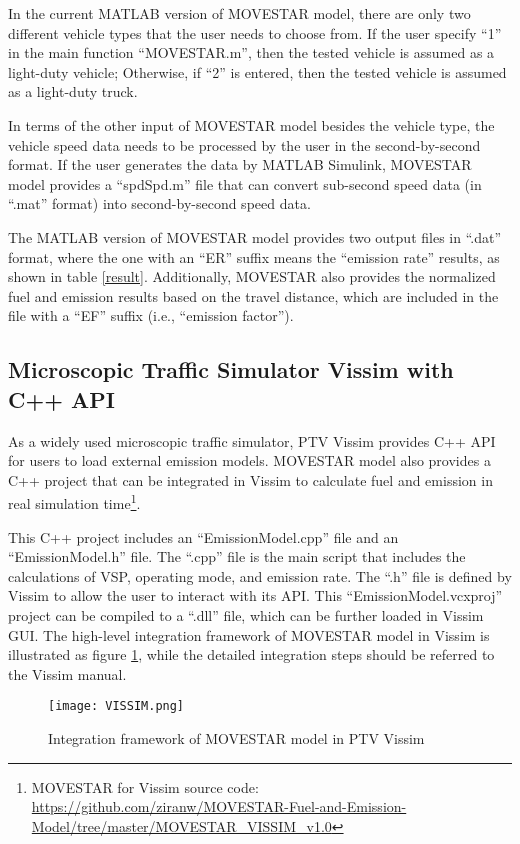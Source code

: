 \documentclass{article}
\begin{document}
In the current MATLAB version of MOVESTAR model, there are only two different vehicle types that the user needs to choose from. If the user specify ``1'' in the main function ``MOVESTAR.m'', then the tested vehicle is assumed as a light-duty vehicle; Otherwise, if ``2'' is entered, then the tested vehicle is assumed as a light-duty truck.

In terms of the other input of MOVESTAR model besides the vehicle type, the vehicle speed data needs to be processed by the user in the second-by-second format. If the user generates the data by MATLAB Simulink, MOVESTAR model provides a ``spdSpd.m'' file that can convert sub-second speed data (in ``.mat'' format) into second-by-second speed data.

The MATLAB version of MOVESTAR model provides two output files in ``.dat'' format, where the one with an ``ER'' suffix means the ``emission rate'' results, as shown in table \ref{result}. Additionally, MOVESTAR also provides the normalized fuel and emission results based on the travel distance, which are included in the file with a ``EF'' suffix (i.e., ``emission factor'').
    
\subsection{Microscopic Traffic Simulator Vissim with C++ API}
As a widely used microscopic traffic simulator, PTV Vissim \cite{VISSIM} provides C++ API for users to load external emission models. MOVESTAR model also provides a C++ project that can be integrated in Vissim to calculate fuel and emission in real simulation time\footnote{MOVESTAR for Vissim source code: \href{https://github.com/ziranw/MOVESTAR-Fuel-and-Emission-Model/tree/master/MOVESTAR_VISSIM_v1.0}{https://github.com/ziranw/MOVESTAR-Fuel-and-Emission-Model/tree/master/MOVESTAR\_VISSIM\_v1.0}}.

This C++ project includes an ``EmissionModel.cpp'' file and an ``EmissionModel.h'' file. The ``.cpp'' file is the main script that includes the calculations of VSP, operating mode, and emission rate. The ``.h'' file is defined by Vissim to allow the user to interact with its API. This ``EmissionModel.vcxproj'' project can be compiled to a ``.dll'' file, which can be further loaded in Vissim GUI. The high-level integration framework 
of MOVESTAR model in Vissim is illustrated as figure \ref{transform}, while the detailed integration steps should be referred to the Vissim manual.

\begin{figure}[ht!]
    \centering
    \texttt{[image: VISSIM.png]}
    \caption{Integration framework of MOVESTAR model in PTV Vissim}
    \label{transform}
\end{figure}
\end{document}
